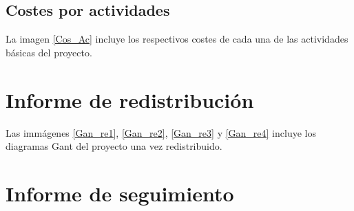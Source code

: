 \documentclass[11pt,a4paper,spanish,twoside]{book}
\begin{document}
\subsection{Costes por actividades}
La imagen \ref{Cos_Ac} incluye los respectivos costes de cada una de las
actividades básicas del proyecto. 

\begin{sidewaystable}
\end{sidewaystable}

\section{Informe de redistribución}
Las immágenes \ref{Gan_re1}, \ref{Gan_re2}, \ref{Gan_re3} y \ref{Gan_re4}
incluye los diagramas Gant del proyecto una vez redistribuido.

\begin{sidewaystable}
\end{sidewaystable}

\begin{sidewaystable}
\end{sidewaystable}

\begin{sidewaystable}
\end{sidewaystable}

\begin{sidewaystable}
\end{sidewaystable}

\section{Informe de seguimiento}


 

\end{document}
